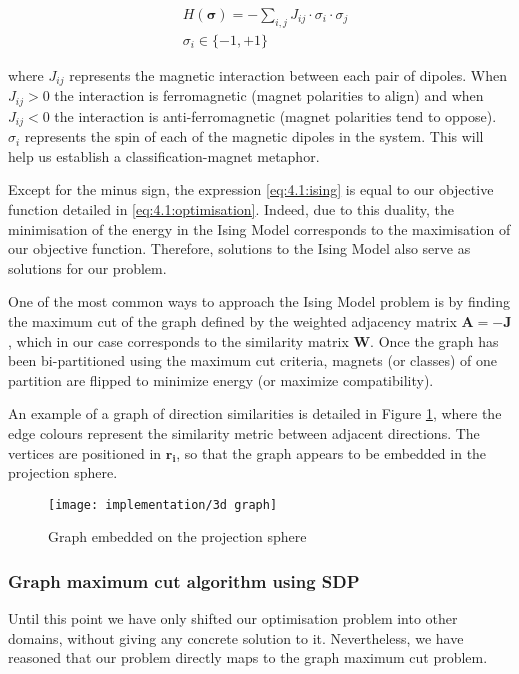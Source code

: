 \documentclass[../main.tex]{subfiles}
\begin{document}
\begin{equation}\label{eq:4.1:ising}
\begin{aligned}
    & H(\bm{\sigma}) = -\sum_{i, j} J_{ij} \cdot \sigma_i \cdot \sigma_j\\
    & \sigma_i \in \{-1, +1\}
\end{aligned}
\end{equation}

where $J_{ij}$ represents the magnetic interaction between each pair of dipoles. When $J_{ij} > 0$ the interaction is ferromagnetic (magnet polarities to align) and when $J_{ij} < 0$ the interaction is anti-ferromagnetic (magnet polarities tend to oppose). $\sigma_i$ represents the spin of each of the magnetic dipoles in the system. This will help us establish a classification-magnet metaphor.

Except for the minus sign, the expression \eqref{eq:4.1:ising} is equal to our objective function detailed in \eqref{eq:4.1:optimisation}. Indeed, due to this duality, the minimisation of the energy in the Ising Model corresponds to the maximisation of our objective function. Therefore, solutions to the Ising Model also serve as solutions for our problem. 

One of the most common ways to approach the Ising Model problem is by finding the maximum cut of the graph defined by the weighted adjacency matrix $\bm{A} = -\bm{J}$, which in our case corresponds to the similarity matrix $\bm{W}$. Once the graph has been bi-partitioned using the maximum cut criteria, magnets (or classes) of one partition are flipped to minimize energy (or maximize compatibility)\cite{kennedy2008}.

An example of a graph of direction similarities is detailed in Figure \ref{fig:4.1:graph}, where the edge colours represent the similarity metric between adjacent directions. The vertices are positioned in $\bm{r_i}$, so that the graph appears to be embedded in the projection sphere.

\begin{figure}[hbp]
    \centering
    \texttt{[image: implementation/3d graph]}
    \caption{Graph embedded on the projection sphere}
    \label{fig:4.1:graph}
\end{figure}

\subsubsection{Graph maximum cut algorithm using SDP}
Until this point we have only shifted our optimisation problem into other domains, without giving any concrete solution to it. Nevertheless, we have reasoned that our problem directly maps to the graph maximum cut problem.
\end{document}
